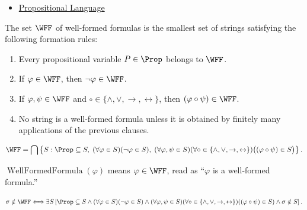 \begin{dependencies}
\begin{itemize}
  \item \hyperref[def:propositional-language]{Propositional Language}
\end{itemize}
\end{dependencies}
\begin{tcolorbox}[colback=propbox, colframe=propborder, arc=2pt,
  left=6pt, right=6pt, top=4pt, bottom=4pt,
  title={\small\textbf{Definition (Well-Formed Formula)}},
  fonttitle=\small\bfseries]
\begin{definition}
\label{def:well-formed-formula}
The set \(\WFF\) of well-formed formulas is the smallest set of strings satisfying the following formation rules:
\begin{enumerate}
\item Every propositional variable \(P\in\Prop\) belongs to \(\WFF\).
\item If \(\varphi\in\WFF\), then \(\neg\varphi\in\WFF\).
\item If \(\varphi,\psi\in\WFF\) and \(\circ\in\{\land,\lor,\to,\leftrightarrow\}\), then \((\varphi\circ\psi)\in\WFF\).
\item No string is a well-formed formula unless it is obtained by finitely many applications of the previous clauses.
\end{enumerate}
\end{definition}
\end{tcolorbox}

\begin{remark*}
\[
\WFF
=
\bigcap
\left\{
S :
\Prop\subseteq S,\;
(\forall\varphi\in S)(\neg\varphi\in S),\;
(\forall\varphi,\psi\in S)
(\forall\circ\in\{\land,\lor,\to,\leftrightarrow\})
\bigl((\varphi\circ\psi)\in S\bigr)
\right\}.
\]
\end{remark*}

\begin{remark*}
\(\operatorname{WellFormedFormula}(\varphi)\) means \(\varphi\in\WFF\), read as “\(\varphi\) is a well-formed formula.”
\end{remark*}

\begin{remark*}
\[
\sigma\notin\WFF
\Longleftrightarrow
\exists S
\left[
\Prop\subseteq S
\land
(\forall\varphi\in S)(\neg\varphi\in S)
\land
(\forall\varphi,\psi\in S)
(\forall\circ\in\{\land,\lor,\to,\leftrightarrow\})
((\varphi\circ\psi)\in S)
\land
\sigma\notin S
\right].
\]
\end{remark*}

